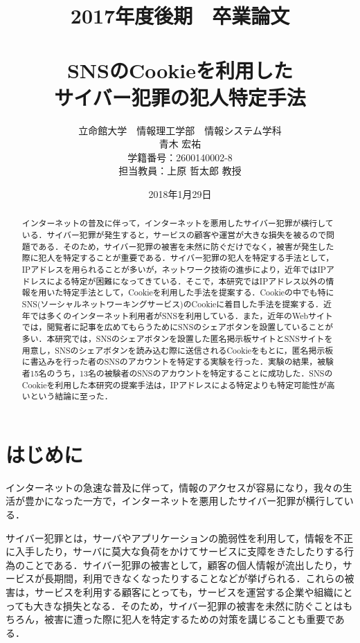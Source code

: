 \documentclass[10pt, a4paper]{jreport}
\title{2017年度後期　卒業論文\\　\\SNSのCookieを利用した\\サイバー犯罪の犯人特定手法}
\author{立命館大学　情報理工学部　情報システム学科\\青木 宏祐\\学籍番号：2600140002-8\\担当教員：上原 哲太郎 教授}
\date{2018年1月29日}
\begin{document}
\maketitle


\begin{abstract}
インターネットの普及に伴って，インターネットを悪用したサイバー犯罪が横行している．サイバー犯罪が発生すると，サービスの顧客や運営が大きな損失を被るので問題である．そのため，サイバー犯罪の被害を未然に防ぐだけでなく，被害が発生した際に犯人を特定することが重要である．サイバー犯罪の犯人を特定する手法として，IPアドレスを用られることが多いが，ネットワーク技術の進歩により，近年ではIPアドレスによる特定が困難になってきている．そこで，本研究ではIPアドレス以外の情報を用いた特定手法として，Cookieを利用した手法を提案する．Cookieの中でも特にSNS(ソーシャルネットワーキングサービス)のCookieに着目した手法を提案する．近年では多くのインターネット利用者がSNSを利用している．また，近年のWebサイトでは，閲覧者に記事を広めてもらうためにSNSのシェアボタンを設置していることが多い．本研究では，SNSのシェアボタンを設置した匿名掲示板サイトとSNSサイトを用意し，SNSのシェアボタンを読み込む際に送信されるCookieをもとに，匿名掲示板に書込みを行った者のSNSのアカウントを特定する実験を行った．実験の結果，被験者15名のうち，13名の被験者のSNSのアカウントを特定することに成功した．SNSのCookieを利用した本研究の提案手法は，IPアドレスによる特定よりも特定可能性が高いという結論に至った．
\end{abstract}

\tableofcontents

\chapter{はじめに}
\setcounter{page}{1}
インターネットの急速な普及に伴って，情報のアクセスが容易になり，我々の生活が豊かになった一方で，インターネットを悪用したサイバー犯罪が横行している．

サイバー犯罪とは，サーバやアプリケーションの脆弱性を利用して，情報を不正に入手したり，サーバに莫大な負荷をかけてサービスに支障をきたしたりする行為のことである．サイバー犯罪の被害として，顧客の個人情報が流出したり，サービスが長期間，利用できなくなったりすることなどが挙げられる．これらの被害は，サービスを利用する顧客にとっても，サービスを運営する企業や組織にとっても大きな損失となる．そのため，サイバー犯罪の被害を未然に防ぐことはもちろん，被害に遭った際に犯人を特定するための対策を講じることも重要である．
\end{document}
